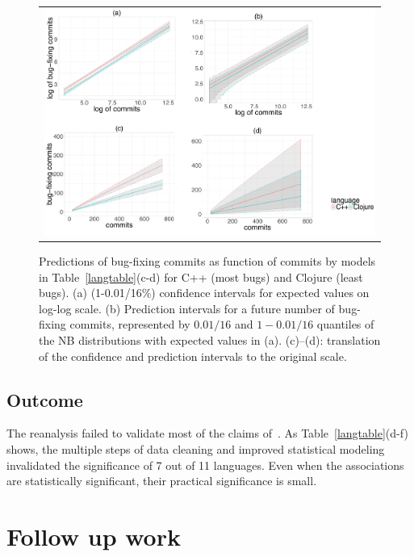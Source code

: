 \documentclass[acmsmall]{acmart}
\begin{document}
\begin{figure}[!h]\begin{center}\begin{tabular}{c}
\includegraphics[width=1\textwidth]{./Pictures/intervals.pdf}
\end{tabular}\end{center}\vspace{-6mm}
\caption{Predictions of bug-fixing commits as function of commits by models
  in Table~\ref{langtable}(c-d) for {C++} (most bugs) and {Clojure} (least
  bugs). (a) (1-0.01/16\%) confidence intervals for expected values on
  log-log scale. (b) Prediction intervals for a future number of bug-fixing
  commits, represented by $0.01/16$ and $1-0.01/16$ quantiles of the NB
  distributions with expected values in (a). (c)--(d): translation of the
  confidence and prediction intervals to the original
  scale.}\label{prediction}
\end{figure}

\subsection{Outcome}

The reanalysis failed to validate most of the claims of~\cite{ray14}.  As
Table~\ref{langtable}(d-f) shows, the multiple steps of data cleaning and
improved statistical modeling invalidated the significance of 7 out of
11 languages. Even when the associations are statistically significant,
their practical significance is small.

\section{Follow up work}\label{threats}
\end{document}
